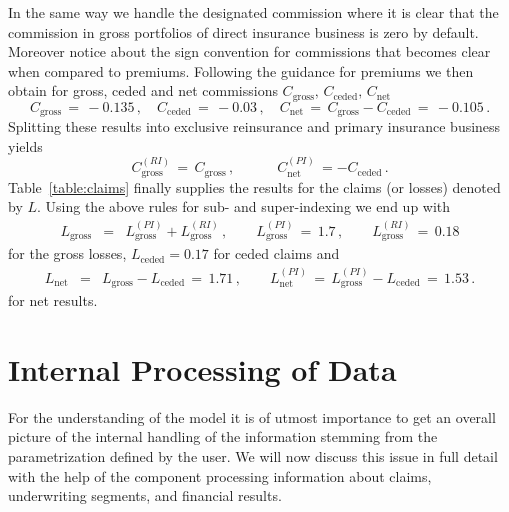 {In the same way we handle the designated commission where it is clear that the commission in gross portfolios of direct insurance
business is zero by default. Moreover notice about the sign convention for commissions that becomes 
clear when compared to premiums. Following the guidance for premiums we then obtain for gross, ceded and net commissions
$C_{\mathrm{gross}},\,C_{\mathrm{ceded}},\,C_{\mathrm{net}}$
\[  C_{\mathrm{gross}}\,=
\,-0.135\,,\quad C_{\mathrm{ceded}}\,=\,-0.03 \,,\quad
C_{\mathrm{net}}\,=\,C_{\mathrm{gross}}-C_{\mathrm{ceded}}\,=\,-0.105\,.\]
Splitting these results into exclusive reinsurance and primary insurance business yields
\[ C_{\mathrm{gross}}^{\scriptscriptstyle{(RI)}}\,=
\,C_{\mathrm{gross}}\,,\qquad\quad
C_{\mathrm{net}}^{\scriptscriptstyle{(PI)}}\,=-C_{\mathrm{ceded}}\,. \]
Table~\ref{table:claims} finally supplies the results for the claims (or losses) denoted by
$L$. Using the above rules for sub- and super-indexing we end up with
\begin{eqnarray*}
L_{\mathrm{gross}} & = & L_{\mathrm{gross}}^{\scriptscriptstyle{(PI)}} +
L_{\mathrm{gross}}^{\scriptscriptstyle{(RI)}}\,,\qquad L_{\mathrm{gross}}^{\scriptscriptstyle{(PI)}}\,=
\,1.7\,,\qquad L_{\mathrm{gross}}^{\scriptscriptstyle{(RI)}}\,=
\,0.18
\end{eqnarray*}
for the gross losses, $L_{\mathrm{ceded}}=0.17$ for ceded claims and
\begin{eqnarray*}
L_{\mathrm{net}} & = &  L_{\mathrm{gross}} -L_{\mathrm{ceded}}\,=\, 1.71\,,\qquad
L_{\mathrm{net}}^{\scriptscriptstyle{(PI)}}\,=\, L_{\mathrm{gross}}^{\scriptscriptstyle{(PI)}}-L_{\mathrm{ceded}}\,=\, 1.53\,.
\end{eqnarray*}
for net results.
}

\section{Internal Processing of Data}\label{sec:processing}

For the understanding of the model it is of utmost importance to get an overall picture of
the internal handling of the information stemming from the parametrization defined by the
user.  We will now discuss this issue in full detail with the help of the 
component processing information about claims, underwriting segments, and financial results.

